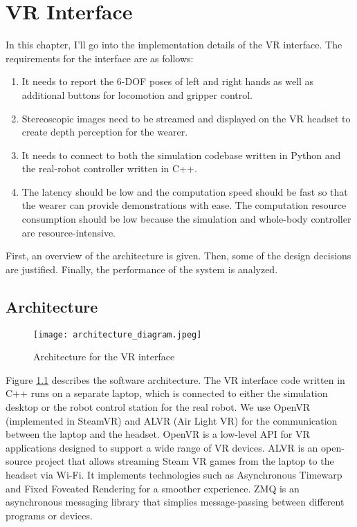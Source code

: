 \chapter{VR Interface}

In this chapter, I'll go into the implementation details of the VR interface. 
The requirements for the interface are as follows:
\begin{enumerate}
    \item It needs to report the 6-DOF poses of left and right hands as well as additional buttons for locomotion and gripper control. 
    \item Stereoscopic images need to be streamed and displayed on the VR headset to create depth perception for the wearer. 
    \item It needs to connect to both the simulation codebase written in Python and the real-robot controller written in C++. 
    \item The latency should be low and the computation speed should be fast so that the wearer can provide demonstrations with ease. The computation resource consumption should be low because the simulation and whole-body controller are resource-intensive.
\end{enumerate}

First, an overview of the architecture is given. Then, some of the design decisions are justified. Finally, the performance of the system is analyzed.

\section{Architecture}

\begin{figure}
	\centering
	\texttt{[image: architecture\_diagram.jpeg]}
	\caption{Architecture for the VR interface}
    \label{fig:vr-interface}
\end{figure}

Figure \ref{fig:vr-interface} describes the software architecture. The VR interface code written in C++ runs on a separate laptop, which is connected to either the simulation desktop or the robot control station for the real robot. We use OpenVR (implemented in SteamVR) and ALVR (Air Light VR) for the communication between the laptop and the headset. OpenVR is a low-level API for VR applications designed to support a wide range of VR devices. ALVR is an open-source project that allows streaming Steam VR games from the laptop to the headset via Wi-Fi. It implements technologies such as Asynchronous Timewarp and Fixed Foveated Rendering for a smoother experience. ZMQ is an asynchronous messaging library that simplies message-passing between different programs or devices. 

